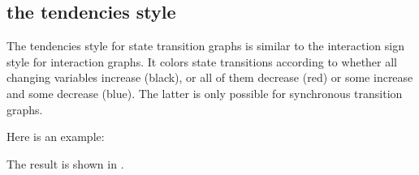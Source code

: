\documentclass[letterpaper,10pt,english]{sphinxmanual}
\begin{document}
\subsection{the tendencies style}
\label{\detokenize{Manual:the-tendencies-style}}
The tendencies style for state transition graphs is similar to the interaction sign style for interaction graphs.
It colors state transitions according to whether all changing variables increase (black), or all of them decrease (red) or some increase and some decrease (blue).
The latter is only possible for synchronous transition graphs.

Here is an example:

\begin{sphinxVerbatim}[commandchars=\\\{\}]
  \PYG{p}{[} \PYG{p}{]}
  
   
\PYG{p}{[}\PYG{p}{]}  
\PYG{p}{[}\PYG{p}{]}  
 
\end{sphinxVerbatim}

The result is shown in {\hyperref[\detokenize{Manual:figure11}]{}}.
\end{document}
